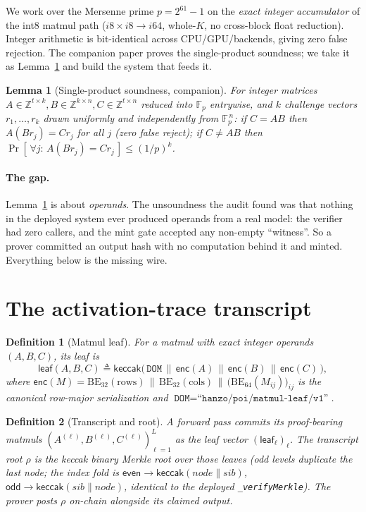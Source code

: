 \documentclass[11pt]{article}
\newtheorem{lemma}[theorem]{Lemma}
\newtheorem{definition}{Definition}
\newcommand{\Fp}{\mathbb{F}_p}
\newcommand{\keccak}{\mathsf{keccak}}
\newcommand{\bydef}{\triangleq}
\begin{document}
We work over the Mersenne prime $p = 2^{61}-1$ on the \emph{exact integer accumulator} of the int8
matmul path ($i8\times i8 \to i64$, whole-$K$, no cross-block float reduction). Integer arithmetic is
bit-identical across CPU/GPU/backends, giving zero false rejection. The companion paper proves the
single-product soundness; we take it as Lemma~\ref{lem:freivalds} and build the system that feeds it.

\begin{lemma}[Single-product soundness, companion]\label{lem:freivalds}
For integer matrices $A\in\mathbb{Z}^{t\times k}, B\in\mathbb{Z}^{k\times n}, C\in\mathbb{Z}^{t\times n}$
reduced into $\Fp$ entrywise, and $k$ challenge vectors $r_1,\dots,r_k$ drawn uniformly and
independently from $\Fp^{\,n}$: if $C = AB$ then $A(Br_j)=Cr_j$ for all $j$ (zero false reject); if
$C\neq AB$ then $\Pr[\,\forall j:\, A(Br_j)=Cr_j\,] \leq (1/p)^k$.
\end{lemma}

\paragraph{The gap.} Lemma~\ref{lem:freivalds} is about \emph{operands}. The unsoundness the audit
found was that nothing in the deployed system ever produced operands from a real model: the verifier
had zero callers, and the mint gate accepted any non-empty ``witness''. So a prover committed an
output hash with no computation behind it and minted. Everything below is the missing wire.

\section{The activation-trace transcript}\label{sec:transcript}

\begin{definition}[Matmul leaf]
For a matmul with exact integer operands $(A,B,C)$, its leaf is
\[
\mathsf{leaf}(A,B,C) \bydef \keccak\big(\,\texttt{DOM} \,\|\, \mathsf{enc}(A) \,\|\, \mathsf{enc}(B) \,\|\, \mathsf{enc}(C)\,\big),
\]
where $\mathsf{enc}(M) = \mathrm{BE}_{32}(\text{rows})\,\|\,\mathrm{BE}_{32}(\text{cols})\,\|\,\big(\mathrm{BE}_{64}(M_{ij})\big)_{ij}$ is the
canonical row-major serialization and $\texttt{DOM}=\texttt{``hanzo/poi/matmul-leaf/v1''}$.
\end{definition}

\begin{definition}[Transcript and root]
A forward pass commits its proof-bearing matmuls $(A^{(\ell)},B^{(\ell)},C^{(\ell)})_{\ell=1}^{L}$ as
the leaf vector $(\mathsf{leaf}_\ell)_{\ell}$. The \emph{transcript root} $\rho$ is the keccak binary
Merkle root over those leaves (odd levels duplicate the last node; the index fold is
$\mathsf{even}\!\to\!\keccak(node\|sib)$, $\mathsf{odd}\!\to\!\keccak(sib\|node)$, identical to the
deployed \texttt{\_verifyMerkle}). The prover posts $\rho$ on-chain alongside its claimed output.
\end{definition}
\end{document}
